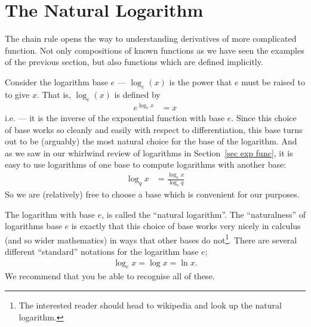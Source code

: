 \section{The Natural Logarithm}\label{sec diff logs}
The chain rule opens the way to understanding derivatives of more complicated
function. Not only compositions of known functions as we have seen the
examples of the previous section, but also functions which are defined
implicitly.

Consider the logarithm base $e$ --- $\log_e(x)$ is the power that $e$ must be
raised to to give $x$.  That is, $\log_e(x)$ is defined by
\begin{align*}
  e^{\log_e x} &= x
\end{align*}
i.e. --- it is the inverse of the exponential function with base $e$.  Since this
choice of base works so cleanly and easily with respect to differentiation,
this base turns out to be (arguably) the most natural choice for the base
of the logarithm. And as we saw in our whirlwind review of
logarithms in Section~\ref{sec exp func}, it is easy to use logarithms of
one base to compute logarithms with another base:
\begin{align*}
  \log_q x &= \frac{\log_e x}{\log_e q}
\end{align*}
So we are (relatively) free to choose a base which is convenient for our
purposes.

The logarithm with base $e$, is called the ``natural logarithm''. The
``naturalness'' of logarithms base $e$ is exactly that this choice of base
works very nicely in calculus (and so wider mathematics) in ways that other
bases do not\footnote{The interested reader should head to wikipedia and look
up the natural logarithm.}. There are several different ``standard'' notations
for the logarithm base
$e$;
\begin{align*}
  \log_e x = \log x = \ln x.
\end{align*}
We recommend that you be able to recognise all of these.



